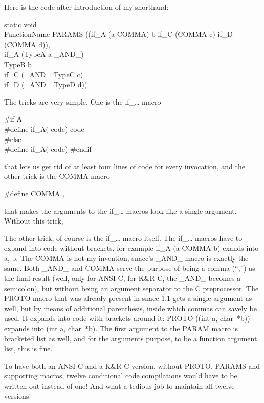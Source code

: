 Here is the code after introduction of my shorthand:

\begin{Ccode}
static void\\
FunctionName PARAMS ((if\_A (a COMMA) b if\_C (COMMA c) if\_D (COMMA d)),\\
  \>if\_A (TypeA a \_AND\_)\\
  \>TypeB b\\
  \>if\_C (\_AND\_ TypeC c)\\
  \>if\_D (\_AND\_ TypeD d))
\end{Ccode}

The tricks are very simple.
One is the {\C if\_\dots} macro

\begin{Ccode}
\#if A\\
\#define if\_A( code)			\>\>\>code\\
\#else\\
\#define if\_A( code)
\#endif
\end{Ccode}

that lets us get rid of at least four lines of code for every invocation, and the other trick is the {\C COMMA} macro

\begin{Ccode}
\#define COMMA \>\>\>,
\end{Ccode}

that makes the arguments to the {\C if\_\dots{}} macros look like a single argument.
Without this trick, 

The other trick, of course is the {\C if\_\dots{}} macro itself.
The {\C if\_\dots{}} macros have to expand into code without brackets, for example {\C if\_A (a COMMA b)} exands into {\C a, b}.
The {\C COMMA} is not my invention, snacc's {\C \_AND\_} macro is exactly the same.
Both {\C \_AND\_} and {\C COMMA} serve the purpose of being a comma (``,'') as the final result (well, only for ANSI C, for K\&R C, the {\C \_AND\_} becomes a semicolon), but without being an argument separator to the C preprocessor.
The {\C PROTO} macro that was already present in snacc 1.1 gets a single argument as well, but by means of additional parenthesis, inside which commas can savely be used.
It expands into code with brackets around it: {\C PROTO ((int a, char~*b))} expands into {\C (int a, char~*b)}.
The first argument to the {\C PARAM} macro is bracketed list as well, and for the arguments purpose, to be a function argument list, this is fine.

To have both an ANSI C and a K\&R C version, without {\C PROTO}, {\C PARAMS} and supporting macros, twelve conditional code compilations would have to be written out instead of one!
And what a tedious job to maintain all twelve versions!
